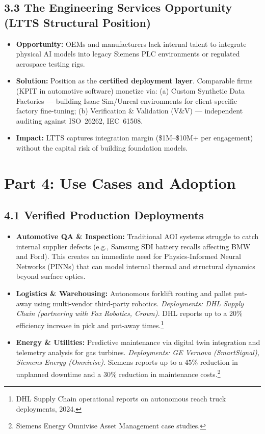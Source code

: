 \documentclass[11pt,a4paper]{article}
\begin{document}
\subsection{3.3 The Engineering Services Opportunity (LTTS Structural Position)}
\begin{itemize}
    \item \textbf{Opportunity:} OEMs and manufacturers lack internal talent to integrate physical AI models into legacy Siemens PLC environments or regulated aerospace testing rigs.
    \item \textbf{Solution:} Position as the \textbf{certified deployment layer}. Comparable firms (KPIT in automotive software) monetize via: (a) Custom Synthetic Data Factories --- building Isaac Sim/Unreal environments for client-specific factory fine-tuning; (b) Verification \& Validation (V\&V) --- independent auditing against ISO~26262, IEC~61508.
    \item \textbf{Impact:} LTTS captures integration margin (\$1M--\$10M+ per engagement) without the capital risk of building foundation models.
\end{itemize}

\section{Part 4: Use Cases and Adoption}

\subsection{4.1 Verified Production Deployments}
\begin{itemize}
    \item \textbf{Automotive QA \& Inspection:} Traditional AOI systems struggle to catch internal supplier defects (e.g., Samsung SDI battery recalls affecting BMW and Ford). This creates an immediate need for Physics-Informed Neural Networks (PINNs) that can model internal thermal and structural dynamics beyond surface optics.
    \item \textbf{Logistics \& Warehousing:} Autonomous forklift routing and pallet put-away using multi-vendor third-party robotics. \textit{Deployments: DHL Supply Chain (partnering with Fox Robotics, Crown).} DHL reports up to a 20\% efficiency increase in pick and put-away times.\footnote{DHL Supply Chain operational reports on autonomous reach truck deployments, 2024.}
    \item \textbf{Energy \& Utilities:} Predictive maintenance via digital twin integration and telemetry analysis for gas turbines. \textit{Deployments: GE Vernova (SmartSignal), Siemens Energy (Omnivise).} Siemens reports up to a 45\% reduction in unplanned downtime and a 30\% reduction in maintenance costs.\footnote{Siemens Energy Omnivise Asset Management case studies.}
\end{itemize}
\end{document}
